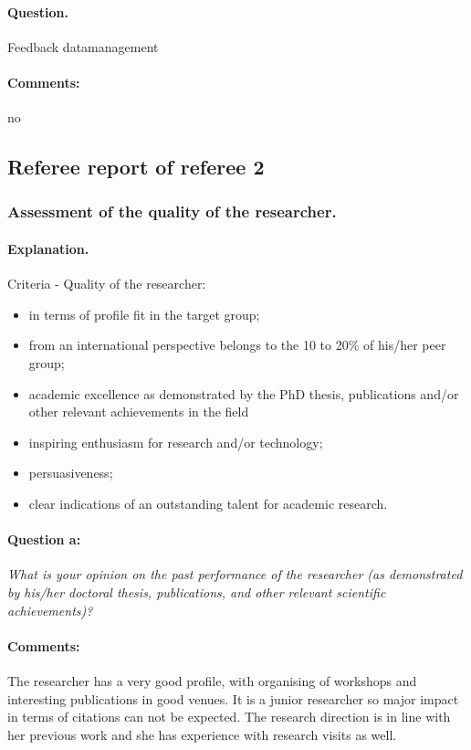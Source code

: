 \documentclass[serif, twocolumn, numeric, rga]{jote-article}
\begin{document}
\paragraph{Question.}
Feedback datamanagement
\paragraph{Comments:}
no

 {}\subsection*{Referee report of referee 2} 

\subsubsection*{Assessment of the quality of the researcher.}
\paragraph{Explanation.}
Criteria - Quality of the researcher:
\begin{itemize}
    \item in terms of profile fit in the target group;
 \item from an international perspective belongs to the 10 to 20\% of his/her peer group;
 \item academic excellence as demonstrated by the PhD thesis, publications and/or other relevant achievements in the field 
    \item inspiring enthusiasm for research and/or technology;
 \item persuasiveness;
 \item clear indications of an outstanding talent for academic research. 
\end{itemize}
\paragraph{Question a:}
\textit{What is your opinion on the past performance of the researcher (as demonstrated by his/her doctoral thesis, publications, and other relevant scientific achievements)?}
\paragraph{Comments:}
The researcher has a very good profile, with organising of workshops and interesting publications in good venues. It is a junior researcher so major impact in terms of citations can not be expected. The research direction is in line with her previous work and she has experience with research visits as well.
\end{document}

